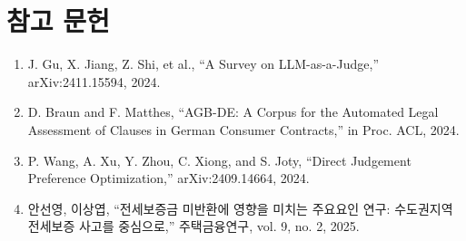 \documentclass[10pt,a4paper]{article}
\begin{document}
\section{참고 문헌}
\begin{enumerate}[label=\arabic*.]
\item J. Gu, X. Jiang, Z. Shi, et al., ``A Survey on LLM-as-a-Judge,'' arXiv:2411.15594, 2024.
\item D. Braun and F. Matthes, ``AGB-DE: A Corpus for the Automated Legal Assessment of Clauses in German Consumer Contracts,'' in Proc. ACL, 2024.
\item P. Wang, A. Xu, Y. Zhou, C. Xiong, and S. Joty, ``Direct Judgement Preference Optimization,'' arXiv:2409.14664, 2024.
\item 안선영, 이상엽, ``전세보증금 미반환에 영향을 미치는 주요요인 연구: 수도권지역 전세보증 사고를 중심으로,'' 주택금융연구, vol. 9, no. 2, 2025.
\end{enumerate}
\end{document}
